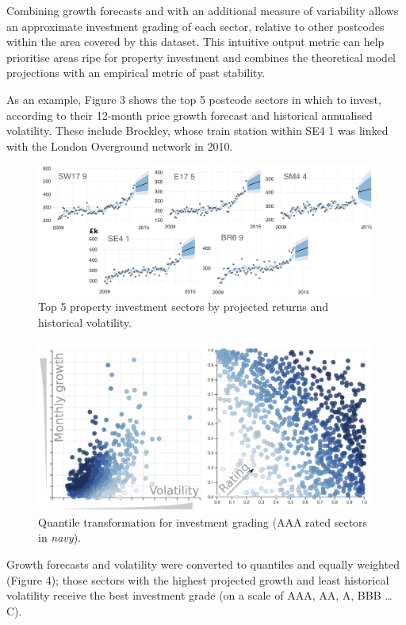 \documentclass[
10pt, %
a4paper, %
oneside, %
headinclude,footinclude, %
BCOR5mm, %
]{scrartcl}
\begin{document}
Combining growth forecasts and with an additional measure of
variability allows an approximate investment grading of each sector,
relative to other postcodes within the area covered by this
dataset. This intuitive output metric can help prioritise areas ripe
for property investment and combines the theoretical model projections
with an empirical metric of past stability.

As an example, Figure 3 shows the top 5 postcode sectors in which to
invest, according to their 12-month price growth forecast and
historical annualised volatility. These include Brockley,
whose train station within SE4 1 was linked with the London Overground network in 2010.\\

\begin{figure}[h]
\begin{center}
\includegraphics[width=.9\textwidth]{Figures/t5.pdf}
\caption{Top 5 property investment sectors by projected returns and historical volatility.}
\end{center}
\end{figure}

\setlength{\intextsep}{0em}
\begin{figure}
\vspace{.5em}
\centering
\includegraphics[width=.44\textwidth]{inkscape/grading_2.png}
\vspace{-1em}
\caption{ Quantile transformation for investment grading
  (AAA rated sectors in \emph{navy}).}
\vspace{.5em}
\end{figure}

Growth forecasts and volatility were converted to quantiles and
equally weighted (Figure 4); those sectors with the highest projected growth
and least historical volatility receive the best investment grade
(on a scale of AAA, AA, A, BBB \ldots C).
\end{document}
